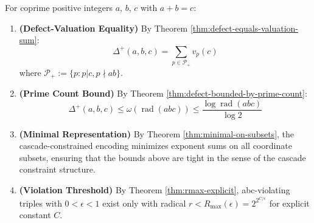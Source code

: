 \begin{theorem}
\label{thm:radical-controlled-defect-complete}

For coprime positive integers $a$, $b$, $c$ with $a + b = c$:

\begin{enumerate}

\item \textbf{(Defect-Valuation Equality)} By Theorem \ref{thm:defect-equals-valuation-sum}:
\begin{equation}
\Delta^+(a,b,c) = \sum_{p \in \mathcal{P}_+} v_p(c)
\end{equation}
where $\mathcal{P}_+ := \{p : p | c, p \nmid ab\}$.

\item \textbf{(Prime Count Bound)} By Theorem \ref{thm:defect-bounded-by-prime-count}:
\begin{equation}
\Delta^+(a,b,c) \leq \omega(\operatorname{rad}(abc)) \leq \frac{\log \operatorname{rad}(abc)}{\log 2}
\end{equation}

\item \textbf{(Minimal Representation)} By Theorem \ref{thm:minimal-on-subsets}, the cascade-constrained encoding minimizes exponent sums on all coordinate subsets, ensuring that the bounds above are tight in the sense of the cascade constraint structure.

\item \textbf{(Violation Threshold)} By Theorem \ref{thm:rmax-explicit}, abc-violating triples with $0 < \epsilon < 1$ exist only with radical $r < R_{\max}(\epsilon) = 2^{2^{C/\epsilon}}$ for explicit constant $C$.

\end{enumerate}

\end{theorem}

